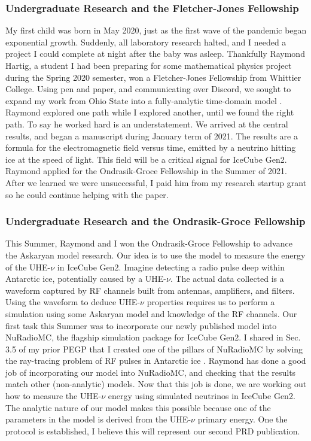 \documentclass[../../../main.tex]{subfiles}
\begin{document}
\subsubsection{Undergraduate Research and the Fletcher-Jones Fellowship}

My first child was born in May 2020, just as the first wave of the pandemic began exponential growth.  Suddenly, all laboratory research halted, and I needed a project I could complete at night after the baby was asleep.  Thankfully Raymond Hartig, a student I had been preparing for some mathematical physics project during the Spring 2020 semester, won a Fletcher-Jones Fellowship from Whittier College.  Using pen and paper, and communicating over Discord, we sought to expand my work from Ohio State into a fully-analytic time-domain model \cite{10.1016/j.astropartphys.2017.03.008}.  Raymond explored one path while I explored another, until we found the right path.  To say he worked hard is an understatement.  We arrived at the central results, and began a manuscript during January term of 2021.  The results are a formula for the electromagnetic field versus time, emitted by a neutrino hitting ice at the speed of light.  This field will be a critical signal for IceCube Gen2.  Raymond applied for the Ondrasik-Groce Fellowship in the Summer of 2021.  After we learned we were unsuccessful, I paid him from my research startup grant so he could continue helping with the paper.

\subsubsection{Undergraduate Research and the Ondrasik-Groce Fellowship}

This Summer, Raymond and I won the Ondrasik-Groce Fellowship to advance the Askaryan model research.  Our idea is to use the model to measure the energy of the UHE-$\nu$ in IceCube Gen2.  Imagine detecting a radio pulse deep within Antarctic ice, potentially caused by a UHE-$\nu$.  The actual data collected is a waveform captured by RF channels built from antennas, amplifiers, and filters.  Using the waveform to deduce UHE-$\nu$ properties requires us to perform a simulation using some Askaryan model and knowledge of the RF channels.  Our first task this Summer was to incorporate our newly published model into NuRadioMC, the flagship simulation package for IceCube Gen2.  I shared in Sec. 3.5 of my prior PEGP that I created one of the pillars of NuRadioMC by solving the ray-tracing problem of RF pulses in Antarctic ice \cite{10.1140/epjc/s10052-020-7612-8} \cite{horizPaper}.  Raymond has done a good job of incorporating our model into NuRadioMC, and checking that the results match other (non-analytic) models.  Now that this job is done, we are working out how to measure the UHE-$\nu$ energy using simulated neutrinos in IceCube Gen2.  The analytic nature of our model makes this possible because one of the parameters in the model is derived from the UHE-$\nu$ primary energy.  One the protocol is established, I believe this will represent our second PRD publication.
\end{document}
